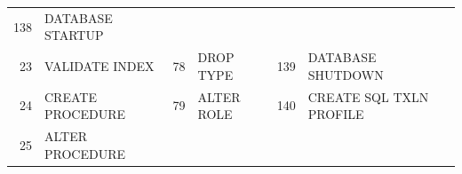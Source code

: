\begin{appendix}
\begin{longtable}[]{@{}rl|rl|rl@{}}
\begin{minipage}[t]{0.06\columnwidth}
138\strut
\end{minipage} & \begin{minipage}[t]{0.24\columnwidth}\raggedright\strut
DATABASE STARTUP\strut
\end{minipage}\tabularnewline
\begin{minipage}[t]{0.06\columnwidth}\raggedright\strut
23\strut
\end{minipage} & \begin{minipage}[t]{0.19\columnwidth}\raggedright\strut
VALIDATE INDEX\strut
\end{minipage} & \begin{minipage}[t]{0.06\columnwidth}\raggedright\strut
78\strut
\end{minipage} & \begin{minipage}[t]{0.24\columnwidth}\raggedright\strut
DROP TYPE\strut
\end{minipage} & \begin{minipage}[t]{0.06\columnwidth}\raggedright\strut
139\strut
\end{minipage} & \begin{minipage}[t]{0.24\columnwidth}\raggedright\strut
DATABASE SHUTDOWN\strut
\end{minipage}\tabularnewline
\begin{minipage}[t]{0.06\columnwidth}\raggedright\strut
24\strut
\end{minipage} & \begin{minipage}[t]{0.19\columnwidth}\raggedright\strut
CREATE PROCEDURE\strut
\end{minipage} & \begin{minipage}[t]{0.06\columnwidth}\raggedright\strut
79\strut
\end{minipage} & \begin{minipage}[t]{0.24\columnwidth}\raggedright\strut
ALTER ROLE\strut
\end{minipage} & \begin{minipage}[t]{0.06\columnwidth}\raggedright\strut
140\strut
\end{minipage} & \begin{minipage}[t]{0.24\columnwidth}\raggedright\strut
CREATE SQL TXLN PROFILE\strut
\end{minipage}\tabularnewline
\begin{minipage}[t]{0.06\columnwidth}\raggedright\strut
25\strut
\end{minipage} & \begin{minipage}[t]{0.19\columnwidth}\raggedright\strut
ALTER PROCEDURE\strut
\end{minipage} & \begin{minipage}[t]{0.06\columnwidth}\raggedright\strut

\end{minipage}
\end{longtable}
\end{appendix}
